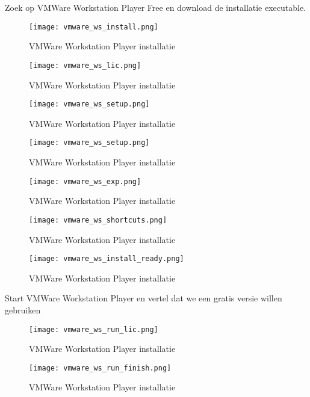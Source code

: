 Zoek op VMWare Workstation Player Free en download de installatie executable.

\begin{figure}[H]
	\centering
	\texttt{[image: vmware\_ws\_install.png]}
	\caption{VMWare Workstation Player installatie}
	\label{VW_ws_install}
\end{figure}

\begin{figure}[H]
	\centering
	\texttt{[image: vmware\_ws\_lic.png]}
	\caption{VMWare Workstation Player installatie}
	\label{VW_ws_install}
\end{figure}

\begin{figure}[H]
	\centering
	\texttt{[image: vmware\_ws\_setup.png]}
	\caption{VMWare Workstation Player installatie}
	\label{VW_ws_install}
\end{figure}

\begin{figure}[H]
	\centering
	\texttt{[image: vmware\_ws\_setup.png]}
	\caption{VMWare Workstation Player installatie}
	\label{VW_ws_install}
\end{figure}

\begin{figure}[H]
	\centering
	\texttt{[image: vmware\_ws\_exp.png]}
	\caption{VMWare Workstation Player installatie}
	\label{VW_ws_install}
\end{figure}

\begin{figure}[H]
	\centering
	\texttt{[image: vmware\_ws\_shortcuts.png]}
	\caption{VMWare Workstation Player installatie}
	\label{VW_ws_install}
\end{figure}

\begin{figure}[H]
	\centering
	\texttt{[image: vmware\_ws\_install\_ready.png]}
	\caption{VMWare Workstation Player installatie}
	\label{VW_ws_install}
\end{figure}

Start VMWare Workstation Player en vertel dat we een gratis versie willen gebruiken
\begin{figure}[H]
	\centering
	\texttt{[image: vmware\_ws\_run\_lic.png]}
	\caption{VMWare Workstation Player installatie}
	\label{VW_ws_install}
\end{figure}

\begin{figure}[H]
	\centering
	\texttt{[image: vmware\_ws\_run\_finish.png]}
	\caption{VMWare Workstation Player installatie}
	\label{VW_ws_install}
\end{figure}


